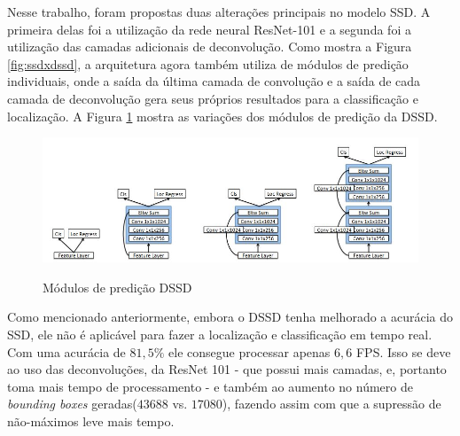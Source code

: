 Nesse trabalho, foram propostas duas alterações principais no modelo \ac{SSD}. A primeira delas foi a utilização da rede neural ResNet-101  e a segunda foi a utilização das camadas adicionais de deconvolução. Como mostra a Figura \ref{fig:ssdxdssd}, a arquitetura agora também utiliza de módulos de predição individuais, onde a saída da última camada de convolução e a saída de cada camada de deconvolução gera seus próprios resultados para a classificação e localização. A Figura \ref{fig:dssdpred} mostra as variações dos módulos de predição da \ac{DSSD}.

\begin{figure}[H]
	\setlength{\abovecaptionskip}{0pt}
	\setlength{\belowcaptionskip}{0pt}
	\caption[Módulos de predição DSSD]{Módulos de predição \ac{DSSD}}
	\centering
	\includegraphics[width=.8\textwidth]{imagem/0x_dssdpredmod.jpg}
	\captionsetup{justification=centering}
	\label{fig:dssdpred}
\end{figure}

Como mencionado anteriormente, embora o \ac{DSSD} tenha melhorado a acurácia do \ac{SSD}, ele não é aplicável para fazer a localização e classificação em tempo real. Com uma acurácia de $81,5\%$ ele consegue processar apenas $6,6$ \ac{FPS}. Isso se deve ao uso das deconvoluções, da ResNet 101 - que possui mais camadas, e, portanto toma mais tempo de processamento - e também ao aumento no número de \textit{bounding boxes} geradas($43688$ vs. $17080$), fazendo assim com que a supressão de não-máximos leve mais tempo.